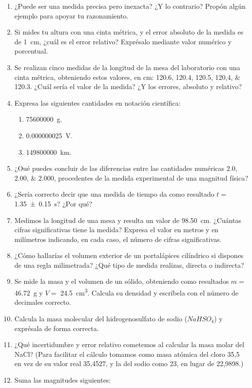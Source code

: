 \documentclass[
]{article}
\providecommand{\tightlist}{%
  \setlength{\itemsep}{0pt}\setlength{\parskip}{0pt}}
\begin{document}
\begin{enumerate}
\def\labelenumi{\arabic{enumi}.}
\item
  ¿Puede ser una medida precisa pero inexacta? ¿Y lo contrario? Propón
  algún ejemplo para apoyar tu razonamiento.
\item
  Si mides tu altura con una cinta métrica, y el error absoluto de la
  medida es de \SI{1}{\cm}, ¿cuál es el error relativo? Exprésalo
  mediante valor numérico y porcentual.
\item
  Se realizan cinco medidas de la longitud de la mesa del laboratorio
  con una cinta métrica, obteniendo estos valores, en \si{cm}:
  \numlist{120,6; 120,4; 120,5;
  120,4; 120,3}. ¿Cuál sería el valor de la medida? ¿Y los errores,
  absoluto y relativo?
\item
  Expresa las siguientes cantidades en notación científica:

  \begin{enumerate}
  \def\labelenumii{\alph{enumii})}
  \tightlist
  \item
    \SI{75600000}{\g}.
  \item
    \SI{0,000000025}{\V}.
  \item
    \SI{149800000}{\km}.
  \end{enumerate}
\item
  ¿Oué puedes concluir de las diferencias entre las cantidades numéricas
  \numlist{2,0;2,00;2,000}, procedentes de la medida experimental de una
  magnitud física?
\item
  ¿Sería correcto decir que una medida de tiempo da como resultado
  \(t =\) \SI{1.35 +- 0.15}{\s}? ¿Por qué?
\item
  Medimos la longitud de una mesa y resulta un valor de \SI{98,50}{\cm}.
  ¿Cuántas cifras significativas tiene la medida? Expresa el valor en
  metros y en milímetros indicando, en cada caso, el número de cifras
  significativas.
\item
  ¿Cómo hallarías el volumen exterior de un portalápices cilíndrico si
  dispones de una regla milimetrada? ¿Qué tipo de medida realizas,
  directa o indirecta?
\item
  Se mide la masa y el volumen de un sólido, obteniendo como resultados
  \(m =\) \SI{46,72}{\g} y \(V =\) \SI{24,5}{\cubic\cm}. Calcula su
  densidad y escríbela con el número de decimales correcto.
\item
  Calcula la masa molecular del hidrogenosulfato de sodio (\(NaHSO_4\))
  y exprésala de forma correcta.
\item
  ¿Qué incertidumbre y error relativo cometemos al calcular la masa
  molar del NaCl? (Para facilitar el cálculo tomamos como masa atómica
  del cloro 35,5 en vez de su valor real 35,4527, y la del sodio como
  23, en lugar de 22,9898.)
\item
  Suma las magnitudes siguientes:


\end{enumerate}
\end{document}
